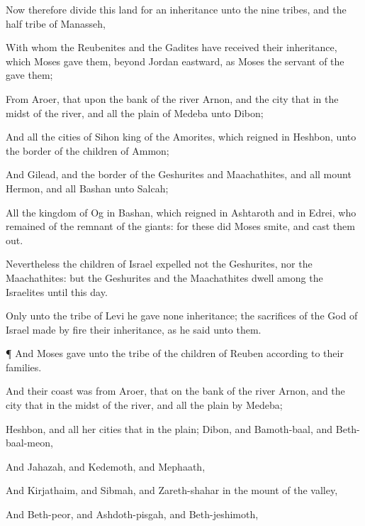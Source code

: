 {\par }{\PP {}Now therefore
divide this
land for an
inheritance unto the
nine
tribes, and the
half
tribe of
Manasseh,

With whom the
Reubenites and the
Gadites have
received their
inheritance, which
Moses
gave them,
beyond
Jordan
eastward,
{} as
Moses the
servant of the
{}
gave them;

From
Aroer, that
{} upon the
bank of the
river
Arnon, and the
city that
{} in the
midst of the
river, and all the
plain of
Medeba unto
Dibon;

And all the
cities of
Sihon
king of the
Amorites, which
reigned in
Heshbon, unto the
border of the
children of
Ammon;

And
Gilead, and the
border of the
Geshurites and
Maachathites, and all
mount
Hermon, and all
Bashan unto
Salcah;

All the
kingdom of
Og in
Bashan, which
reigned in
Ashtaroth and in
Edrei, who
remained of the
remnant of the
giants: for these did
Moses
smite, and cast them
out.

Nevertheless the
children of
Israel
expelled not the
Geshurites, nor the
Maachathites: but the
Geshurites and the
Maachathites
dwell
among the
Israelites until this
day.

Only unto the
tribe of
Levi he
gave none
inheritance; the
sacrifices of the
{}
God of
Israel made by
fire
{} their
inheritance, as he
said unto them.


\par }{\PP {}¶ And
Moses
gave unto the
tribe of the
children of
Reuben
{} according to their
families.

And their
coast was from
Aroer, that
{} on the
bank of the
river
Arnon, and the
city that
{} in the
midst of the
river, and all the
plain by
Medeba;

Heshbon, and all her
cities that
{} in the
plain;
Dibon, and
Bamoth-baal, and
Beth-baal-meon,

And
Jahazah, and
Kedemoth, and
Mephaath,

And
Kirjathaim, and
Sibmah, and
Zareth-shahar in the
mount of the
valley,

And
Beth-peor, and
Ashdoth-pisgah, and
Beth-jeshimoth,

}
